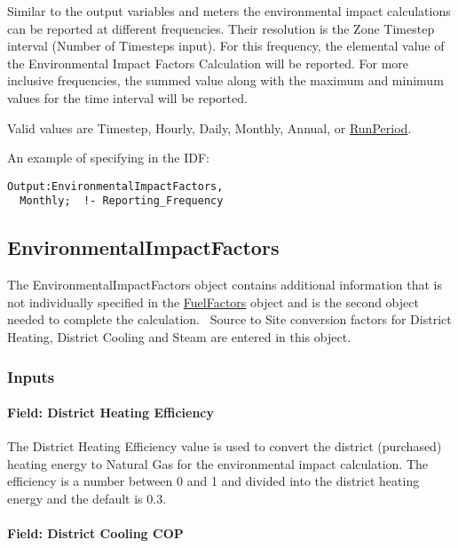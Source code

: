 Similar to the output variables and meters the environmental impact calculations can be reported at different frequencies. Their resolution is the Zone Timestep interval (Number of Timesteps input). For this frequency, the elemental value of the Environmental Impact Factors Calculation will be reported. For more inclusive frequencies, the summed value along with the maximum and minimum values for the time interval will be reported.

Valid values are Timestep, Hourly, Daily, Monthly, Annual, or \hyperref[runperiod]{RunPeriod}.

An example of specifying in the IDF:

\begin{lstlisting}
Output:EnvironmentalImpactFactors,
  Monthly;  !- Reporting_Frequency
\end{lstlisting}

\subsection{EnvironmentalImpactFactors}\label{environmentalimpactfactors}

The EnvironmentalImpactFactors object contains additional information that is not individually specified in the \hyperref[fuelfactors]{FuelFactors} object and is the second object needed to complete the calculation.~ Source to Site conversion factors for District Heating, District Cooling and Steam are entered in this object.

\subsubsection{Inputs}\label{inputs-10-017}

\paragraph{Field: District Heating Efficiency}\label{field-district-heating-efficiency}

The District Heating Efficiency value is used to convert the district (purchased) heating energy to Natural Gas for the environmental impact calculation. The efficiency is a number between 0 and 1 and divided into the district heating energy and the default is 0.3.

\paragraph{Field: District Cooling COP}\label{field-district-cooling-cop}

